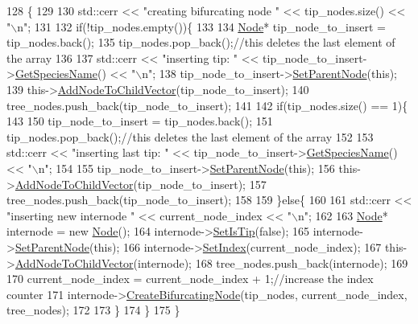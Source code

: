 \begin{DoxyCode}
128                                                                                                            
            \{
129   
130   std::cerr << \textcolor{stringliteral}{"creating bifurcating node "} << tip\_nodes.size() << \textcolor{stringliteral}{"\(\backslash\)n"};
131  
132   \textcolor{keywordflow}{if}(!tip\_nodes.empty())\{
133     
134     \hyperlink{classNode}{Node}* tip\_node\_to\_insert = tip\_nodes.back();
135     tip\_nodes.pop\_back();\textcolor{comment}{//this deletes the last element of the array}
136     
137     std::cerr << \textcolor{stringliteral}{"inserting tip: "} << tip\_node\_to\_insert->\hyperlink{classNode_a9787fabf589f2b0764482b41091f775b}{GetSpeciesName}() << \textcolor{stringliteral}{"\(\backslash\)n"};
138     tip\_node\_to\_insert->\hyperlink{classNode_acb22b8f28ca70e1316a6bafc375ee352}{SetParentNode}(\textcolor{keyword}{this});
139     this->\hyperlink{classNode_aef73af92aa3046218f83ed67a7996188}{AddNodeToChildVector}(tip\_node\_to\_insert);
140     tree\_nodes.push\_back(tip\_node\_to\_insert);
141     
142     \textcolor{keywordflow}{if}(tip\_nodes.size() == 1)\{
143       
150       tip\_node\_to\_insert = tip\_nodes.back();
151       tip\_nodes.pop\_back();\textcolor{comment}{//this deletes the last element of the array}
152       
153       std::cerr << \textcolor{stringliteral}{"inserting last tip: "} << tip\_node\_to\_insert->\hyperlink{classNode_a9787fabf589f2b0764482b41091f775b}{GetSpeciesName}() << \textcolor{stringliteral}{"\(\backslash\)n"};
154       
155       tip\_node\_to\_insert->\hyperlink{classNode_acb22b8f28ca70e1316a6bafc375ee352}{SetParentNode}(\textcolor{keyword}{this});
156       this->\hyperlink{classNode_aef73af92aa3046218f83ed67a7996188}{AddNodeToChildVector}(tip\_node\_to\_insert);
157       tree\_nodes.push\_back(tip\_node\_to\_insert);
158       
159     \}\textcolor{keywordflow}{else}\{
160       
161       std::cerr << \textcolor{stringliteral}{"inserting new internode "} << current\_node\_index << \textcolor{stringliteral}{"\(\backslash\)n"};
162       
163       \hyperlink{classNode}{Node}* internode = \textcolor{keyword}{new} \hyperlink{classNode_ad7a34779cad45d997bfd6d3d8043c75f}{Node}();
164       internode->\hyperlink{classNode_a89bff92e3930d521439395ccf332418f}{SetIsTip}(\textcolor{keyword}{false});
165       internode->\hyperlink{classNode_acb22b8f28ca70e1316a6bafc375ee352}{SetParentNode}(\textcolor{keyword}{this});
166       internode->\hyperlink{classNode_a6f2acc7b954108a6fe266838fce50ef6}{SetIndex}(current\_node\_index);
167       this->\hyperlink{classNode_aef73af92aa3046218f83ed67a7996188}{AddNodeToChildVector}(internode);
168       tree\_nodes.push\_back(internode);
169       
170       current\_node\_index = current\_node\_index + 1;\textcolor{comment}{//increase the index counter}
171       internode->\hyperlink{classNode_aed21bd99e0d680ea7c6a1524e989b9d4}{CreateBifurcatingNode}(tip\_nodes, current\_node\_index, tree\_nodes);
172       
173     \}
174   \}
175 \}
\end{DoxyCode}
\mbox{\label{classNode_a9b9823315fd95dcd24aac97316de2859}} 
